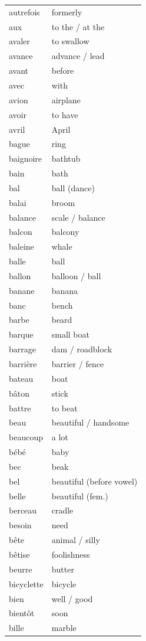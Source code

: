 \documentclass[12pt,a4paper]{article}
\begin{document}
\begin{longtable}{p{4cm} p{6cm}}
autrefois & formerly \\
aux & to the / at the \\
avaler & to swallow \\
avance & advance / lead \\
avant & before \\
avec & with \\
avion & airplane \\
avoir & to have \\
avril & April \\
bague & ring \\
baignoire & bathtub \\
bain & bath \\
bal & ball (dance) \\
balai & broom \\
balance & scale / balance \\
balcon & balcony \\
baleine & whale \\
balle & ball \\
ballon & balloon / ball \\
banane & banana \\
banc & bench \\
barbe & beard \\
barque & small boat \\
barrage & dam / roadblock \\
barrière & barrier / fence \\
bateau & boat \\
bâton & stick \\
battre & to beat \\
beau & beautiful / handsome \\
beaucoup & a lot \\
bébé & baby \\
bec & beak \\
bel & beautiful (before vowel) \\
belle & beautiful (fem.) \\
berceau & cradle \\
besoin & need \\
bête & animal / silly \\
bêtise & foolishness \\
beurre & butter \\
bicyclette & bicycle \\
bien & well / good \\
bientôt & soon \\
bille & marble \\

\end{longtable}
\end{document}
